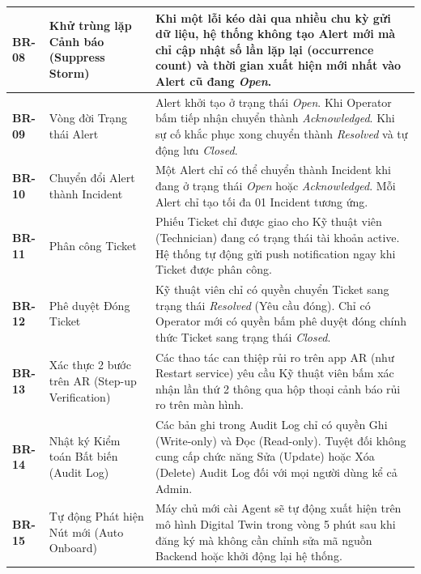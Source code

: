 \begin{longtable}{|p{2.5cm}|p{4.5cm}|p{7.5cm}|}
\textbf{BR-08} & Khử trùng lặp Cảnh báo (Suppress Storm) & Khi một lỗi kéo dài qua nhiều chu kỳ gửi dữ liệu, hệ thống không tạo Alert mới mà chỉ cập nhật số lần lặp lại (occurrence count) và thời gian xuất hiện mới nhất vào Alert cũ đang \textit{Open}. \\ \hline
\textbf{BR-09} & Vòng đời Trạng thái Alert & Alert khởi tạo ở trạng thái \textit{Open}. Khi Operator bấm tiếp nhận chuyển thành \textit{Acknowledged}. Khi sự cố khắc phục xong chuyển thành \textit{Resolved} và tự động lưu \textit{Closed}. \\ \hline
\textbf{BR-10} & Chuyển đổi Alert thành Incident & Một Alert chỉ có thể chuyển thành Incident khi đang ở trạng thái \textit{Open} hoặc \textit{Acknowledged}. Mỗi Alert chỉ tạo tối đa 01 Incident tương ứng. \\ \hline
\textbf{BR-11} & Phân công Ticket & Phiếu Ticket chỉ được giao cho Kỹ thuật viên (Technician) đang có trạng thái tài khoản active. Hệ thống tự động gửi push notification ngay khi Ticket được phân công. \\ \hline
\textbf{BR-12} & Phê duyệt Đóng Ticket & Kỹ thuật viên chỉ có quyền chuyển Ticket sang trạng thái \textit{Resolved} (Yêu cầu đóng). Chỉ có Operator mới có quyền bấm phê duyệt đóng chính thức Ticket sang trạng thái \textit{Closed}. \\ \hline
\textbf{BR-13} & Xác thực 2 bước trên AR (Step-up Verification) & Các thao tác can thiệp rủi ro trên app AR (như Restart service) yêu cầu Kỹ thuật viên bấm xác nhận lần thứ 2 thông qua hộp thoại cảnh báo rủi ro trên màn hình. \\ \hline
\textbf{BR-14} & Nhật ký Kiểm toán Bất biến (Audit Log) & Các bản ghi trong Audit Log chỉ có quyền Ghi (Write-only) và Đọc (Read-only). Tuyệt đối không cung cấp chức năng Sửa (Update) hoặc Xóa (Delete) Audit Log đối với mọi người dùng kể cả Admin. \\ \hline
\textbf{BR-15} & Tự động Phát hiện Nút mới (Auto Onboard) & Máy chủ mới cài Agent sẽ tự động xuất hiện trên mô hình Digital Twin trong vòng 5 phút sau khi đăng ký mà không cần chỉnh sửa mã nguồn Backend hoặc khởi động lại hệ thống. \\ \hline
\end{longtable}

